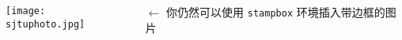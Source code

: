 \documentclass{ctexbeamer}
\begin{document}
\begin{frame}[fragile]
\begin{columns}
\begin{column}{0.45\textwidth}
        \begin{columns}[b]
          \begin{column}{.5\textwidth}
            \begin{stampbox}
              \texttt{[image: sjtuphoto.jpg]}
            \end{stampbox}
          \end{column}
          \begin{column}{.5\textwidth}
            $\leftarrow$ 你仍然可以使用 \texttt{stampbox} 环境插入带边框的图片\vspace{1ex}
          \end{column}
        \end{columns}
      \end{column}
    \end{columns}
  \end{frame}
\end{document}
